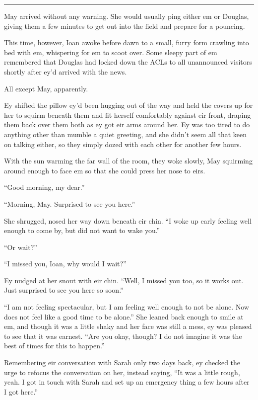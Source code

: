 \begin{center}\rule{0.5\linewidth}{0.5pt}\end{center}

May arrived without any warning. She would usually ping either em or Douglas, giving them a few minutes to get out into the field and prepare for a pouncing.

This time, however, Ioan awoke before dawn to a small, furry form crawling into bed with em, whispering for em to scoot over. Some sleepy part of em remembered that Douglas had locked down the ACLs to all unannounced visitors shortly after ey'd arrived with the news.

All except May, apparently.

Ey shifted the pillow ey'd been hugging out of the way and held the covers up for her to squirm beneath them and fit herself comfortably against eir front, draping them back over them both as ey got eir arms around her. Ey was too tired to do anything other than mumble a quiet greeting, and she didn't seem all that keen on talking either, so they simply dozed with each other for another few hours.

With the sun warming the far wall of the room, they woke slowly, May squirming around enough to face em so that she could press her nose to eirs.

``Good morning, my dear.''

``Morning, May. Surprised to see you here.''

She shrugged, nosed her way down beneath eir chin. ``I woke up early feeling well enough to come by, but did not want to wake you.''

``Or wait?''

``I missed you, Ioan, why would I wait?''

Ey nudged at her snout with eir chin. ``Well, I missed you too, so it works out. Just surprised to see you here so soon.''

``I am not feeling spectacular, but I am feeling well enough to not be alone. Now does not feel like a good time to be alone.'' She leaned back enough to smile at em, and though it was a little shaky and her face was still a mess, ey was pleased to see that it was earnest. ``Are you okay, though? I do not imagine it was the best of times for this to happen.''

Remembering eir conversation with Sarah only two days back, ey checked the urge to refocus the conversation on her, instead saying, ``It was a little rough, yeah. I got in touch with Sarah and set up an emergency thing a few hours after I got here.''

